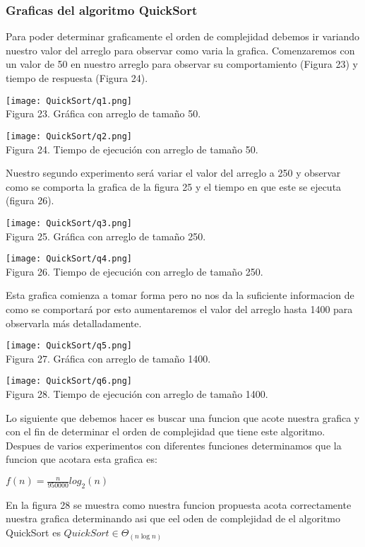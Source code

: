 \documentclass[12pt,twoside]{article}
\begin{document}
\subsubsection{Graficas del algoritmo QuickSort}
Para poder determinar graficamente el orden de complejidad debemos ir variando nuestro valor del arreglo para observar como varia la grafica. Comenzaremos con un valor de 50 en nuestro  arreglo para observar su comportamiento (Figura 23) y tiempo de respuesta (Figura 24).
\begin{center}
    \texttt{[image: QuickSort/q1.png]}\\
    Figura 23. Gr\'afica con arreglo de tamaño 50.
\end{center}
\begin{center}
    \texttt{[image: QuickSort/q2.png]}\\
    Figura 24. Tiempo de ejecuci\'on con arreglo de tamaño 50.
\end{center}
Nuestro segundo experimento será variar el valor del arreglo a 250 y observar como se comporta la grafica de la figura 25 y el tiempo en que este se ejecuta (figura 26).
\begin{center}
    \texttt{[image: QuickSort/q3.png]}\\
    Figura 25. Gr\'afica con arreglo de tamaño 250.
\end{center}
\begin{center}
    \texttt{[image: QuickSort/q4.png]}\\
    Figura 26. Tiempo de ejecuci\'on con arreglo de tamaño 250.
\end{center}
Esta grafica comienza a tomar forma pero no nos da la suficiente informacion de como se comportar\'a por esto aumentaremos el valor del arreglo hasta 1400 para observarla más detalladamente.
\begin{center}
    \texttt{[image: QuickSort/q5.png]}\\
    Figura 27. Gr\'afica con arreglo de tamaño 1400.
\end{center}
\begin{center}
    \texttt{[image: QuickSort/q6.png]}\\
    Figura 28. Tiempo de ejecuci\'on con arreglo de tamaño 1400.
\end{center}
Lo siguiente que debemos hacer es buscar una funcion que acote nuestra grafica y con el fin de determinar el orden de complejidad que tiene este algoritmo. Despues de varios experimentos con diferentes funciones determinamos que la funcion que acotara esta grafica es:
\begin{center}
    $f(n) = \frac{n}{950000}log_2(n)$
\end{center}
En la figura 28 se muestra como nuestra funcion propuesta acota correctamente nuestra grafica determinando asi que eel oden de complejidad de el algoritmo QuickSort es
$ QuickSort\in \Theta_{(n \log n)}$
\end{document}
